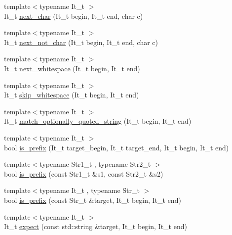\begin{DoxyCompactItemize}
\item 
{\footnotesize template$<$typename It\+\_\+t $>$ }\\It\+\_\+t \mbox{\hyperlink{namespacexd_1_1util_1_1string_acf865d1183dfde2a4c505a0c4ca0d63d}{next\+\_\+char}} (It\+\_\+t begin, It\+\_\+t end, char c)
\item 
{\footnotesize template$<$typename It\+\_\+t $>$ }\\It\+\_\+t \mbox{\hyperlink{namespacexd_1_1util_1_1string_a41b23d87a18d193fdf6572b9d644e2fc}{next\+\_\+not\+\_\+char}} (It\+\_\+t begin, It\+\_\+t end, char c)
\item 
{\footnotesize template$<$typename It\+\_\+t $>$ }\\It\+\_\+t \mbox{\hyperlink{namespacexd_1_1util_1_1string_a9872a2bbf2d81feb9c504f0f62b4e080}{next\+\_\+whitespace}} (It\+\_\+t begin, It\+\_\+t end)
\item 
{\footnotesize template$<$typename It\+\_\+t $>$ }\\It\+\_\+t \mbox{\hyperlink{namespacexd_1_1util_1_1string_a9f49114d05158d1b0b60d0ad2e471b7e}{skip\+\_\+whitespace}} (It\+\_\+t begin, It\+\_\+t end)
\item 
{\footnotesize template$<$typename It\+\_\+t $>$ }\\It\+\_\+t \mbox{\hyperlink{namespacexd_1_1util_1_1string_a8ef3266e15a5b77eb6c198697a0f4a36}{match\+\_\+optionally\+\_\+quoted\+\_\+string}} (It\+\_\+t begin, It\+\_\+t end)
\item 
{\footnotesize template$<$typename It\+\_\+t $>$ }\\bool \mbox{\hyperlink{namespacexd_1_1util_1_1string_ab1782745921b7b9d41e795009cb27a83}{is\+\_\+prefix}} (It\+\_\+t target\+\_\+begin, It\+\_\+t target\+\_\+end, It\+\_\+t begin, It\+\_\+t end)
\item 
{\footnotesize template$<$typename Str1\+\_\+t , typename Str2\+\_\+t $>$ }\\bool \mbox{\hyperlink{namespacexd_1_1util_1_1string_a24b0ab7d5012342c113ea60dbc1fef43}{is\+\_\+prefix}} (const Str1\+\_\+t \&s1, const Str2\+\_\+t \&s2)
\item 
{\footnotesize template$<$typename It\+\_\+t , typename Str\+\_\+t $>$ }\\bool \mbox{\hyperlink{namespacexd_1_1util_1_1string_a9a7d78daf733e49ea8e009343d1b8660}{is\+\_\+prefix}} (const Str\+\_\+t \&target, It\+\_\+t begin, It\+\_\+t end)
\item 
{\footnotesize template$<$typename It\+\_\+t $>$ }\\It\+\_\+t \mbox{\hyperlink{namespacexd_1_1util_1_1string_ae41891173f05bb3afb7521da739ff9f2}{expect}} (const std\+::string \&target, It\+\_\+t begin, It\+\_\+t end)
\end{DoxyCompactItemize}


